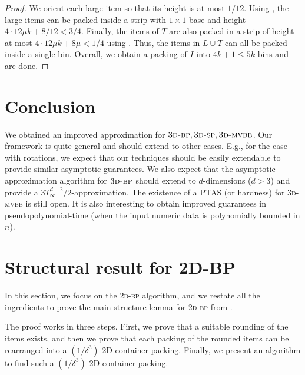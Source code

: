 \documentclass[a4paper,UKenglish,cleveref, autoref, thm-restate]{lipics-v2021}
\newcommand{\twobp}{\textsc{2d-bp}\xspace}
\newcommand{\tbp}{\textsc{3d-bp}\xspace}
\newcommand{\tsp}{\textsc{3d-sp}\xspace}
\newcommand{\tmvc}{\textsc{3d-mvbb}\xspace}
\begin{document}
\begin{proof}
    We orient each large item so that its height is at most $1/12$. Using , the large items can be packed inside a strip with $1\times 1$ base and height $4\cdot 12\mu k + 8/12 < 3/4$. Finally, the items of $T$ are also packed in a strip of height at most $4\cdot 12\mu k + 8\mu < 1/4$ using . Thus, the items in $L\cup T$ can all be packed inside a single bin. Overall, we obtain a packing of $I$ into $4k+1 \le 5k$ bins and are done.
\end{proof}

\section{Conclusion}
\label{sec:conc}
We obtained an improved approximation for $\tbp, \tsp, \tmvc$.
Our framework is quite general and should extend to other cases.
E.g., for the case with rotations, we expect that our techniques should be easily extendable to provide similar asymptotic guarantees. 
We also expect that the asymptotic approximation algorithm for $\tbp$  should extend to $d$-dimensions ($d>3$) and provide a $3T_{\infty}^{d-2}/2$-approximation. 
The existence of a PTAS (or hardness) for \tmvc is still open. 
It is also interesting to obtain improved guarantees in pseudopolynomial-time (when the input numeric data is polynomially bounded in $n$).


\appendix




















\section{Structural result for 2D-BP}
\label{subsec:2dbpAppndix}
In this section, we focus on the \twobp algorithm, and we restate all the ingredients to prove the main structure lemma for \twobp from \cite{jansen2016new}.

\twoBPStructure*

The proof works in three steps. First, we prove that a suitable rounding of the items exists, and then we prove that each packing of the rounded items can be rearranged into a $(1/\delta^3)$-2D-container-packing. Finally, we present an algorithm to find such a $(1/\delta^3)$-2D-container-packing.
\end{document}
